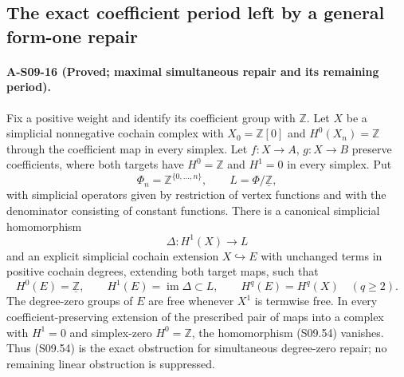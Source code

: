 \subsection{The exact coefficient period left by a general form-one repair}

\paragraph{A-S09-16 (Proved; maximal simultaneous repair and its remaining period).}
Fix a positive weight and identify its coefficient group with
$\mathbb Z$.  Let $X$ be a simplicial nonnegative cochain complex
with $X_0=\mathbb Z[0]$ and $H^0(X_n)=\mathbb Z$ through the
coefficient map in every simplex.  Let $f:X\to A$, $g:X\to B$
preserve coefficients, where both targets have $H^0=\mathbb Z$
and $H^1=0$ in every simplex.  Put
\[
 \Phi_n=\mathbb Z^{\{0,\ldots,n\}},\qquad
 L=\Phi/\underline{\mathbb Z},
 \tag{S09.53}
\]
with simplicial operators given by restriction of vertex
functions and with the denominator consisting of constant
functions.  There is a canonical simplicial homomorphism
\[
 \Delta:H^1(X)\longrightarrow L                       \tag{S09.54}
\]
and an explicit simplicial cochain extension $X\hookrightarrow E$
with unchanged terms in positive cochain degrees, extending both
target maps, such that
\[
 H^0(E)=\underline{\mathbb Z},\qquad
 H^1(E)=\operatorname{im}\Delta\subset L,
 \qquad H^q(E)=H^q(X)\quad(q\geq2).                    \tag{S09.55}
\]
The degree-zero groups of $E$ are free whenever $X^1$ is
termwise free.  In every coefficient-preserving extension
of the prescribed pair of maps into a complex with
$H^1=0$ and simplex-zero $H^0=\mathbb Z$, the homomorphism
(S09.54) vanishes.  Thus (S09.54) is the exact obstruction
for simultaneous degree-zero repair; no remaining
linear obstruction is suppressed.

